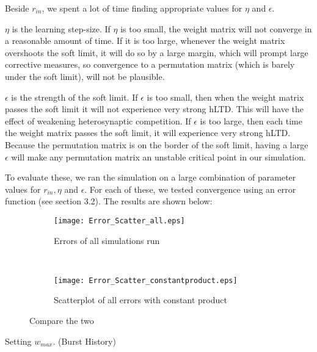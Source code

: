 Beside \(r_{in}\), we spent a lot of time finding appropriate values for \(\eta\) and \(\epsilon\). 

\(\eta\) is the learning step-size. If \(\eta\) is too small, the weight matrix will not converge in a reasonable amount of time. If it is too large, whenever the weight matrix overshoots the soft limit, it will do so by a large margin, which will prompt large corrective measures, so convergence to a permutation matrix (which is barely under the soft limit), will not be plausible.
 
\(\epsilon\) is the strength of the soft limit. If \(\epsilon\) is too small, then when the weight matrix passes the soft limit it will not experience very strong hLTD. This will have the effect of weakening heterosynaptic competition. If \(\epsilon\) is too large, then each time the weight matrix passes the soft limit, it will experience very strong hLTD. Because the permutation matrix is on the border of the soft limit, having a large \(\epsilon\) will make any permutation matrix an unstable critical point in our simulation.

To evaluate these, we ran the simulation on a large combination of parameter values for \(r_{in}, \eta\) and \(\epsilon\). For each of these, we tested convergence using an error function (see section 3.2). The results are shown below:

\begin{figure}[H]
\centering
\begin{subfigure}[b]{0.49\textwidth}
\texttt{[image: Error\_Scatter\_all.eps]}
\label{Error_scatter: all}
\caption{Errors of all simulations run}
\end{subfigure}
\,
\begin{subfigure}[b]{0.49\textwidth}
\texttt{[image: Error\_Scatter\_constantproduct.eps]}
\label{Error_scatter: constant product}
\caption{Scatterplot of all errors with constant product}
\end{subfigure}
\label{Error_scatter}
\caption{Compare the two}
\end{figure}

Setting \(w_{max}\). (Burst History)

